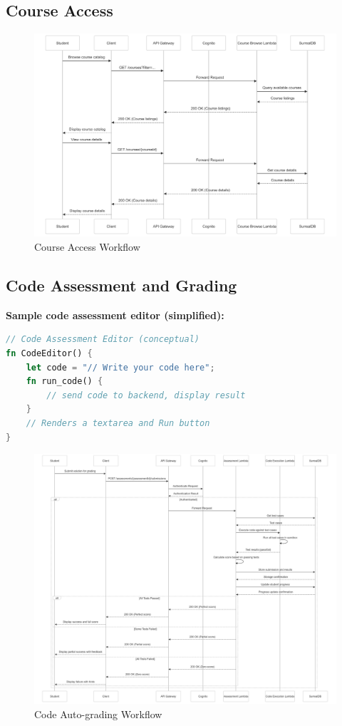 \documentclass[a4paper, 11pt]{scrreprt}
\begin{document}
\subsection{Course Access}
\begin{figure}[!htb]
    \centering
    \includegraphics[height=0.4\textheight]{student_access_course.png}
    \caption{Course Access Workflow}
\end{figure}

\subsection{Code Assessment and Grading}
\noindent\textbf{Sample code assessment editor (simplified):}
\begin{lstlisting}[language=Rust]
// Code Assessment Editor (conceptual)
fn CodeEditor() {
    let code = "// Write your code here";
    fn run_code() {
        // send code to backend, display result
    }
    // Renders a textarea and Run button
}
\end{lstlisting}

\begin{figure}[!htb]
    \centering
    \includegraphics[height=0.4\textheight]{code_grade.png}
    \caption{Code Auto-grading Workflow}
\end{figure}
\end{document}
